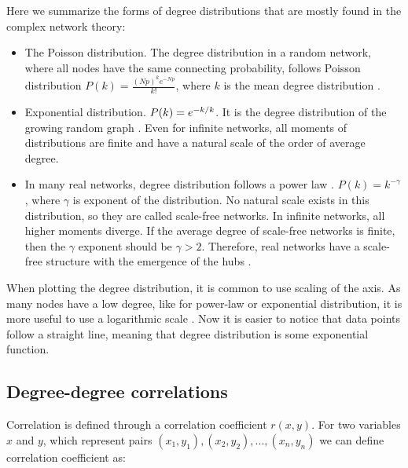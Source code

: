 Here we summarize the forms of degree distributions that are mostly found in the complex network theory:
\begin{itemize}
	\item The Poisson distribution. The degree distribution in a random network, where all nodes have the same connecting probability, follows Poisson distribution $P(k)= \frac{(Np)^ke^{-Np}}{k!}$, where $k$ is the mean degree distribution \cite{barabasi2016network}. 
	
	\item Exponential distribution. $P(k) = e^{-k/ \- k}$. It is the degree distribution of the growing random graph \cite{barabasi2016network}. Even for infinite networks, all moments of distributions are finite and have a natural scale of the order of average degree.
	
	\item In many real networks, degree distribution follows a power law \cite{barabasi2016network, newman2010}. $P(k) = k ^ {-\gamma} $, where $\gamma$ is exponent of the distribution. No natural scale exists in this distribution, so they are called scale-free networks. In infinite networks, all higher moments diverge. If the average degree of scale-free networks is finite, then the $\gamma$ exponent should be $\gamma>2$. Therefore, real networks have a scale-free structure with the emergence of the hubs \cite{newman2010}. 

\end{itemize}

When plotting the degree distribution, it is common to use scaling of the axis. As many nodes have a low degree, like for power-law or exponential distribution, it is more useful to use a logarithmic scale \cite{caldarelli2007scalefree}. Now it is easier to notice that data points follow a straight line, meaning that degree distribution is some exponential function. 

\subsection{Degree-degree correlations} 

Correlation is defined through a correlation coefficient $r(x, y)$. For two variables $x$ and $y$, which represent pairs $(x_1, y_1), (x_2, y_2), ...,(x_n, y_n)$ we can define correlation coefficient \cite{van2010graph} as: 


